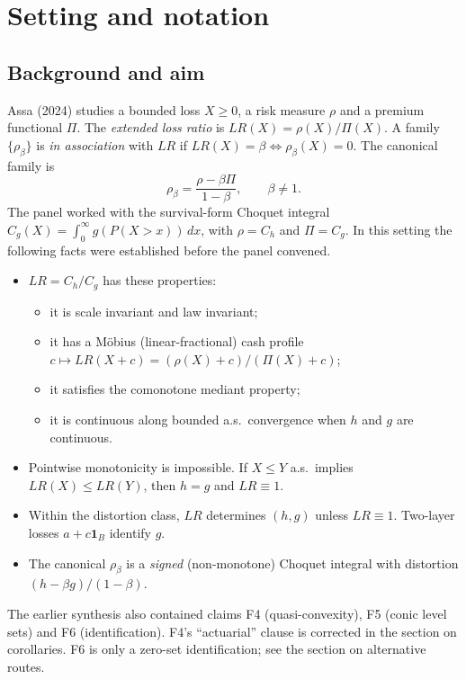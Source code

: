 \section{Setting and notation}

\subsection{Background and aim}

Assa (2024) studies a bounded loss $X\ge 0$, a risk measure $\rho$ and a premium functional $\Pi$. The \emph{extended loss ratio} is $LR(X)=\rho(X)/\Pi(X)$. A family $\{\rho_\beta\}$ is \emph{in association} with $LR$ if $LR(X)=\beta\iff\rho_\beta(X)=0$. The canonical family is
\[
\rho_\beta=\frac{\rho-\beta\Pi}{1-\beta},\qquad \beta\neq 1 .
\]
The panel worked with the survival-form Choquet integral $C_g(X)=\int_0^\infty g(P(X>x))\,dx$, with $\rho=C_h$ and $\Pi=C_g$. In this setting the following facts were established before the panel convened.

\begin{itemize}
\item[(F1)] $LR=C_h/C_g$ has these properties:
  \begin{itemize}
  \item it is scale invariant and law invariant;
  \item it has a M\"obius (linear-fractional) cash profile $c\mapsto LR(X+c)=(\rho(X)+c)/(\Pi(X)+c)$;
  \item it satisfies the comonotone mediant property;
  \item it is continuous along bounded a.s.\ convergence when $h$ and $g$ are continuous.
  \end{itemize}
\item[(F2)] Pointwise monotonicity is impossible. If $X\le Y$ a.s.\ implies $LR(X)\le LR(Y)$, then $h=g$ and $LR\equiv 1$.
\item[(F3)] Within the distortion class, $LR$ determines $(h,g)$ unless $LR\equiv 1$. Two-layer losses $a+c\mathbf 1_B$ identify $g$.
\item[(F7)] The canonical $\rho_\beta$ is a \emph{signed} (non-monotone) Choquet integral with distortion $(h-\beta g)/(1-\beta)$.
\end{itemize}

The earlier synthesis also contained claims F4 (quasi-convexity), F5 (conic level sets) and F6 (identification). F4's ``actuarial'' clause is corrected in the section on corollaries. F6 is only a zero-set identification; see the section on alternative routes.

